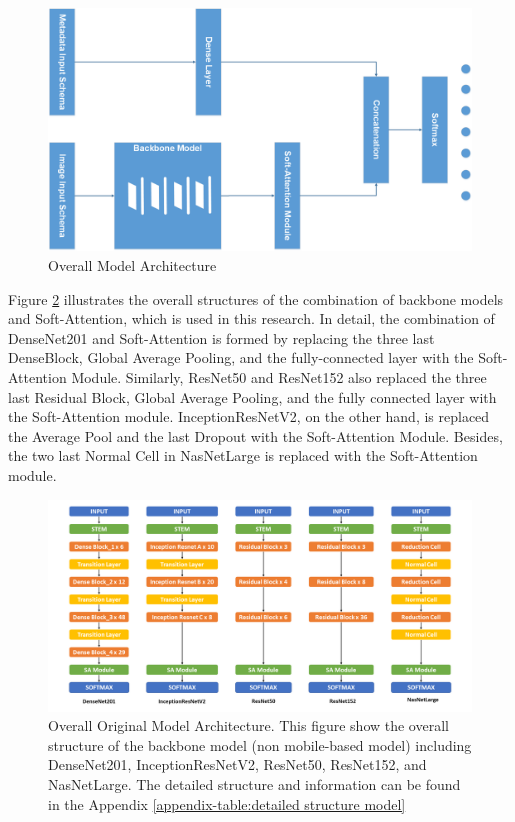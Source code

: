 \documentclass[sensors,article,submit,pdftex,moreauthors]{Definitions/mdpi}
\begin{document}
	\begin{figure}[H]
		\centering
		\includegraphics[width=0.8\linewidth]{Definitions/MainModel - Model Form}
		\caption{Overall Model Architecture}
		\label{fig:main-model}
	\end{figure}
	
	Figure \ref{fig:model-structure} illustrates the overall structures of the combination of backbone models and Soft-Attention, which is used in this research. In detail, the combination of DenseNet201 and Soft-Attention is formed by replacing the three last DenseBlock, Global Average Pooling, and the fully-connected layer with the Soft-Attention Module. Similarly, ResNet50 and ResNet152 also replaced the three last Residual Block, Global Average Pooling, and the fully connected layer with the Soft-Attention module. InceptionResNetV2, on the other hand, is replaced the Average Pool and the last Dropout with the Soft-Attention Module. Besides, the two last Normal Cell in NasNetLarge is replaced with the Soft-Attention module. 
	
	\begin{figure}[H]
		\centering
		\includegraphics[width=1\linewidth]{Definitions/Model Structure}
		\caption{Overall Original Model Architecture. This figure show the overall structure of the backbone model (non mobile-based model) including DenseNet201, InceptionResNetV2, ResNet50, ResNet152, and NasNetLarge. The detailed structure and information can be found in the Appendix \ref{appendix-table:detailed structure model}}
		\label{fig:model-structure}
	\end{figure}
	
\end{document}
